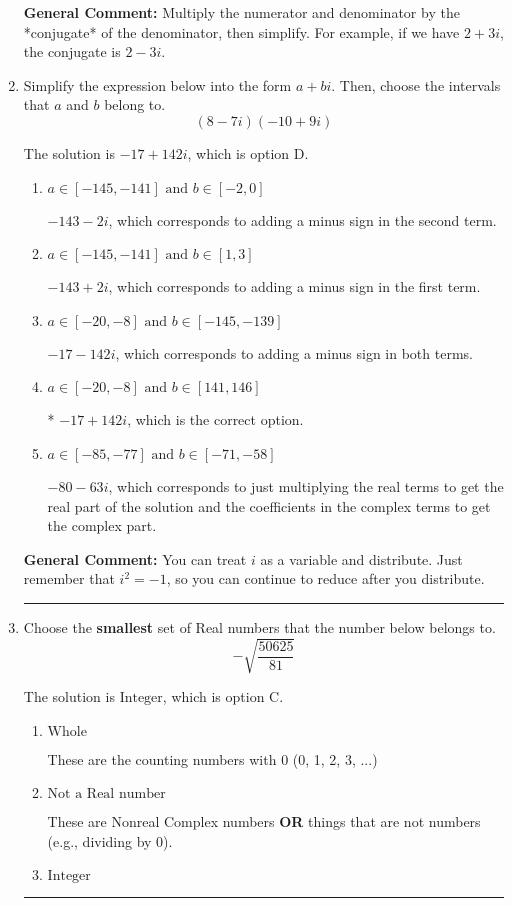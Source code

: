 \documentclass{extbook}[14pt]
\newcommand{\litem}[1]{\item #1

\rule{\textwidth}{0.4pt}}
\begin{document}
\begin{enumerate}
{\textbf{General Comment:} Multiply the numerator and denominator by the *conjugate* of the denominator, then simplify. For example, if we have $2+3i$, the conjugate is $2-3i$.
}
\litem{
Simplify the expression below into the form $a+bi$. Then, choose the intervals that $a$ and $b$ belong to.
\[ (8 - 7 i)(-10 + 9 i) \]

The solution is \( -17 + 142 i \), which is option D.\begin{enumerate}[label=\Alph*.]
\item \( a \in [-145, -141] \text{ and } b \in [-2, 0] \)

 $-143 - 2 i$, which corresponds to adding a minus sign in the second term.
\item \( a \in [-145, -141] \text{ and } b \in [1, 3] \)

 $-143 + 2 i$, which corresponds to adding a minus sign in the first term.
\item \( a \in [-20, -8] \text{ and } b \in [-145, -139] \)

 $-17 - 142 i$, which corresponds to adding a minus sign in both terms.
\item \( a \in [-20, -8] \text{ and } b \in [141, 146] \)

* $-17 + 142 i$, which is the correct option.
\item \( a \in [-85, -77] \text{ and } b \in [-71, -58] \)

 $-80 - 63 i$, which corresponds to just multiplying the real terms to get the real part of the solution and the coefficients in the complex terms to get the complex part.
\end{enumerate}

\textbf{General Comment:} You can treat $i$ as a variable and distribute. Just remember that $i^2=-1$, so you can continue to reduce after you distribute.
}
\litem{
Choose the \textbf{smallest} set of Real numbers that the number below belongs to.
\[ -\sqrt{\frac{50625}{81}} \]

The solution is \( \text{Integer} \), which is option C.\begin{enumerate}[label=\Alph*.]
\item \( \text{Whole} \)

These are the counting numbers with 0 (0, 1, 2, 3, ...)
\item \( \text{Not a Real number} \)

These are Nonreal Complex numbers \textbf{OR} things that are not numbers (e.g., dividing by 0).
\item \( \text{Integer} \)


\end{enumerate}}
\end{enumerate}
\end{document}
